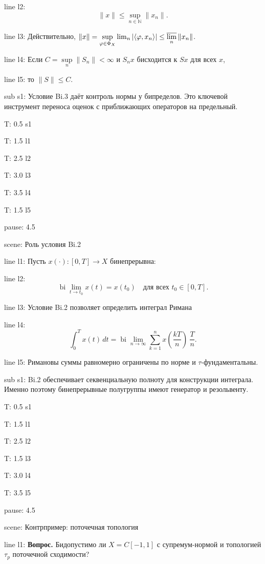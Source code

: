 \documentclass[a4paper,11pt]{article}
\newcommand{\N}{\mathbb{N}}
\let\ph\varphi
\begin{document}
line l2: {$$\|x\|\le\sup\limits_{n\in\N}\|x_n\|.$$}

line l3: {Действительно, $\|x\|=\sup\limits_{\ph\in\Phi_X}\lim_n|\langle\ph,x_n\rangle|\le\varlimsup\limits_n\|x_n\|$.}

line l4: {Если $C=\sup\limits_n\|S_n\|<\infty$ и $S_n x$ бисходится к $Sx$ для всех $x$,}

line l5: {то $\|S\|\le C$.}


sub s1: {Условие Bi.3 даёт контроль нормы у бипределов. Это ключевой инструмент переноса оценок с приближающих операторов на предельный.}


T: 0.5 s1

T: 1.5 l1

T: 2.5 l2

T: 3.0 l3

T: 3.5 l4

T: 1.5 l5

pause: 4.5



scene: {Роль условия Bi.2}

line l1: {Пусть $x(\cdot):[0,T]\to X$ бинепрерывна:}

line l2: {$$\operatorname{bi}\lim\limits_{t\to t_0}x(t)=x(t_0)\quad\text{для всех }t_0\in[0,T].$$}

line l3: {Условие Bi.2 позволяет определить интеграл Римана}

line l4: {$$\int_0^T x(t)\,dt=\operatorname{bi}\lim\limits_{n\to\infty}\sum\limits_{k=1}^n x\left(\frac{kT}{n}\right)\ \dfrac{T}{n}.$$}

line l5: {Римановы суммы равномерно ограничены по норме и $\tau$-фундаментальны.}


sub s1: {Bi.2 обеспечивает секвенциальную полноту для конструкции интеграла. Именно поэтому бинепрерывные полугруппы имеют генератор и резольвенту.}


T: 0.5 s1

T: 1.5 l1

T: 2.5 l2

T: 1.5 l3

T: 3.0 l4

T: 3.5 l5

pause: 4.5



scene: {Контрпример: поточечная топология}

line l1: {\textbf{Вопрос.} Бидопустимо ли $X=C[-1,1]$ с супремум-нормой и топологией $\tau_p$ поточечной сходимости?}
\end{document}
